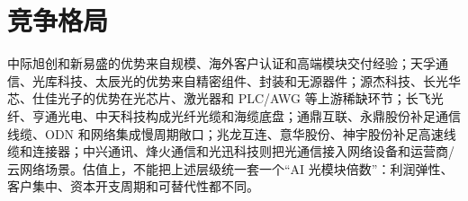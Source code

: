 \section{竞争格局}
中际旭创和新易盛的优势来自规模、海外客户认证和高端模块交付经验；天孚通信、光库科技、太辰光的优势来自精密组件、封装和无源器件；源杰科技、长光华芯、仕佳光子的优势在光芯片、激光器和 PLC/AWG 等上游稀缺环节；长飞光纤、亨通光电、中天科技构成光纤光缆和海缆底盘；通鼎互联、永鼎股份补足通信线缆、ODN 和网络集成慢周期敞口；兆龙互连、意华股份、神宇股份补足高速线缆和连接器；中兴通讯、烽火通信和光迅科技则把光通信接入网络设备和运营商/云网络场景。估值上，不能把上述层级统一套一个“AI 光模块倍数”：利润弹性、客户集中、资本开支周期和可替代性都不同。
